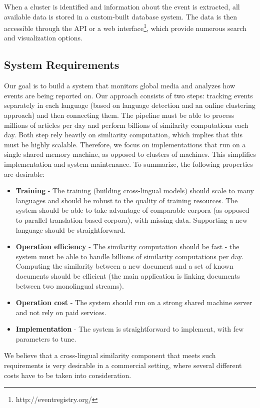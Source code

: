 \documentclass[twoside,11pt]{article}
\begin{document}
When a cluster is identified and information about the event is extracted, all available data is stored in a custom-built database system. The data is then accessible through the API or a web interface\footnote{http://eventregistry.org/}, which provide numerous search and visualization options.


\subsection{System Requirements}
\label{sec:sysreq}

Our goal is to build a system that monitors global media and analyzes how events are being reported on. Our approach consists of two steps: tracking events separately in each language (based on language detection and an online clustering approach) and then connecting them. The pipeline must be able to process millions of articles per day and perform billions of similarity computations each day. Both step rely heavily on simliarity computation, which implies that this must be highly scalable.
%
Therefore, we focus on implementations that run on a single shared memory machine, as opposed to clusters of machines. This  simplifies implementation and system maintenance.
To summarize, the following properties are desirable:
\begin{itemize}
\item \textbf{Training} - The training (building cross-lingual models) should scale to many languages and should be robust to the quality of training resources. The system should be able to take advantage of comparable corpora (as opposed to parallel translation-based corpora), with missing data. Supporting a new language should be straightforward.
\item \textbf{Operation efficiency} - The similarity computation should be fast - the system must be able to handle billions of similarity computations per day. Computing the similarity between a new document and a set of known documents should be efficient (the main application is linking documents between two monolingual streams).
\item \textbf{Operation cost} - The system should run on a strong shared machine server and not rely on paid services.
\item \textbf{Implementation} - The system is straightforward to implement, with few parameters to tune.
\end{itemize}
We believe that a cross-lingual similarity component that meets such requirements is very desirable in a commercial setting, where several different costs have to be taken into consideration.
\end{document}
